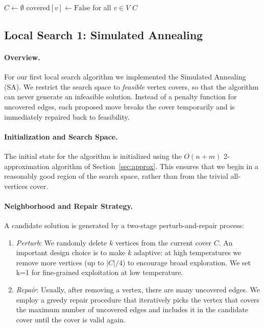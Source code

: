 \documentclass[sigconf]{acmart}
\begin{document}
\begin{algorithm}[ht]
  \SetAlgoLined
  \DontPrintSemicolon
  $C \leftarrow \emptyset$\;
  $\text{covered}[v] \leftarrow \text{False}$ for all $v \in V$\;
  \Return $C$\;
  \caption{Greedy 2-Approximation for MVC.}
  \label{alg:approx}
\end{algorithm}

\subsection{Local Search 1: Simulated Annealing}
\label{sec:ls1}

\paragraph{Overview.}
For our first local search algorithm we implemented the Simulated Annealing (SA). We restrict the search space to \emph{feasible} vertex covers, so that the algorithm can never generate an infeasible solution. Instead of a penalty function for uncovered edges, each proposed move breaks the cover temporarily and is immediately repaired back to feasibility.


\paragraph{Initialization and Search Space.}
The initial state for the algorithm is initialized using the $O(n+m)$ 2-approximation algorithm of Section~\ref{sec:approx}. This ensures that we begin in a reasonably good region of the search space, rather than from the trivial all-vertices cover.

\paragraph{Neighborhood and Repair Strategy.}
A candidate solution is generated by a two-stage perturb-and-repair process:
\begin{enumerate}\itemsep=2pt
  \item \emph{Perturb}: We randomly delete $k$ vertices from the current cover $C$. An important design choice is to make $k$ adaptive: at high temperatures we remove more vertices (up to $|C|/4$) to encourage broad exploration. We set k=1 for fine-grained exploitation at low temperature.
  \item \emph{Repair}: Usually, after removing a vertex, there are many uncovered edges. We employ a greedy repair procedure that iteratively picks the vertex that covers the maximum number of uncovered edges and includes it in the candidate cover until the cover is valid again.
\end{enumerate}
\end{document}
